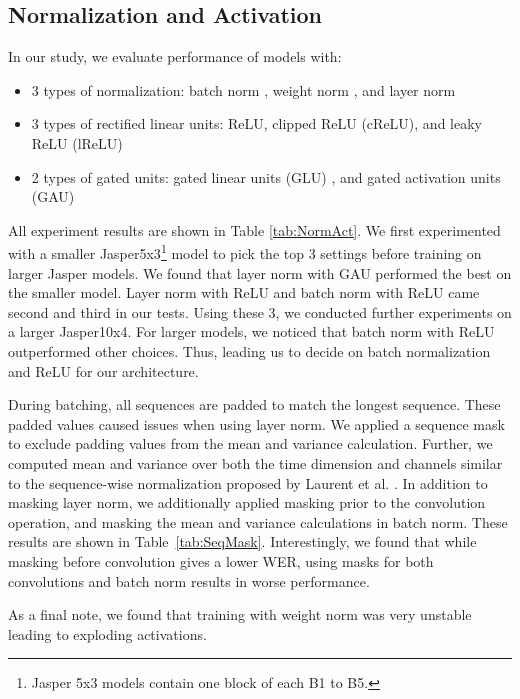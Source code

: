 \documentclass[a4paper]{article}
\begin{document}
\subsection{Normalization and Activation}
In our study, we evaluate performance of models with:
\begin{itemize}
    \item 3 types of normalization: batch norm \cite{IoffeS15BatchNorm}, weight norm \cite{ Salimans2016WeightNorm}, and layer norm  \cite{Ba2016LayerNorm}
    \item 3 types of rectified linear units: ReLU, clipped ReLU (cReLU), and leaky ReLU (lReLU) 
    \item 2 types of gated units: gated linear units (GLU) \cite{Dauphin2017GLU}, and gated activation units (GAU) \cite{Oord2016PixelCNN}
\end{itemize}
All experiment results are shown in Table \ref{tab:NormAct}. We first experimented with a smaller Jasper5x3\footnote{
Jasper 5x3 models contain one block of each B1 to B5.
}
model to pick the top 3 settings before training on larger Jasper models. We found that layer norm with GAU performed the best on the smaller model. Layer norm with ReLU and batch norm with ReLU came second and third in our tests. Using these 3, we conducted further experiments on a larger Jasper10x4. For larger models, we noticed that batch norm with ReLU outperformed other choices. Thus, leading us to decide on batch normalization and ReLU for our architecture.

During batching, all sequences are padded to match the longest sequence. These padded values caused issues when using layer norm. We applied a sequence mask to exclude padding values from the mean and variance calculation. Further, we computed mean and variance over both the time dimension and channels similar to the sequence-wise normalization proposed by Laurent et al. \cite{LaurentSeqWiseBN}. In addition to masking layer norm, we additionally applied masking prior to the convolution operation, and masking the mean and variance calculations in batch norm. These results are shown in Table~\ref{tab:SeqMask}. Interestingly, we found that while masking before convolution gives a lower WER, using masks for both convolutions and batch norm results in worse performance.

As a final note, we found that training with weight norm was very unstable leading to exploding activations.
\end{document}
